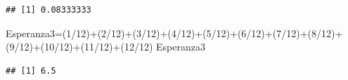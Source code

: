 \documentclass[
]{article}
\newenvironment{Shaded}{\begin{snugshade}}{\end{snugshade}}
\newcommand{\DecValTok}[1]{\textcolor[rgb]{0.00,0.00,0.81}{#1}}
\newcommand{\NormalTok}[1]{#1}
\newcommand{\OtherTok}[1]{\textcolor[rgb]{0.56,0.35,0.01}{#1}}
\newcommand{\SpecialCharTok}[1]{\textcolor[rgb]{0.00,0.00,0.00}{#1}}
\begin{document}
\begin{verbatim}
## [1] 0.08333333
\end{verbatim}

\begin{Shaded}
\begin{Highlighting}[]
\NormalTok{Esperanza3}\OtherTok{=}\NormalTok{(}\DecValTok{1}\SpecialCharTok{/}\DecValTok{12}\NormalTok{)}\SpecialCharTok{+}\NormalTok{(}\DecValTok{2}\SpecialCharTok{/}\DecValTok{12}\NormalTok{)}\SpecialCharTok{+}\NormalTok{(}\DecValTok{3}\SpecialCharTok{/}\DecValTok{12}\NormalTok{)}\SpecialCharTok{+}\NormalTok{(}\DecValTok{4}\SpecialCharTok{/}\DecValTok{12}\NormalTok{)}\SpecialCharTok{+}\NormalTok{(}\DecValTok{5}\SpecialCharTok{/}\DecValTok{12}\NormalTok{)}\SpecialCharTok{+}\NormalTok{(}\DecValTok{6}\SpecialCharTok{/}\DecValTok{12}\NormalTok{)}\SpecialCharTok{+}\NormalTok{(}\DecValTok{7}\SpecialCharTok{/}\DecValTok{12}\NormalTok{)}\SpecialCharTok{+}\NormalTok{(}\DecValTok{8}\SpecialCharTok{/}\DecValTok{12}\NormalTok{)}\SpecialCharTok{+}\NormalTok{(}\DecValTok{9}\SpecialCharTok{/}\DecValTok{12}\NormalTok{)}\SpecialCharTok{+}\NormalTok{(}\DecValTok{10}\SpecialCharTok{/}\DecValTok{12}\NormalTok{)}\SpecialCharTok{+}\NormalTok{(}\DecValTok{11}\SpecialCharTok{/}\DecValTok{12}\NormalTok{)}\SpecialCharTok{+}\NormalTok{(}\DecValTok{12}\SpecialCharTok{/}\DecValTok{12}\NormalTok{)}
\NormalTok{Esperanza3}
\end{Highlighting}
\end{Shaded}

\begin{verbatim}
## [1] 6.5
\end{verbatim}
\end{document}
